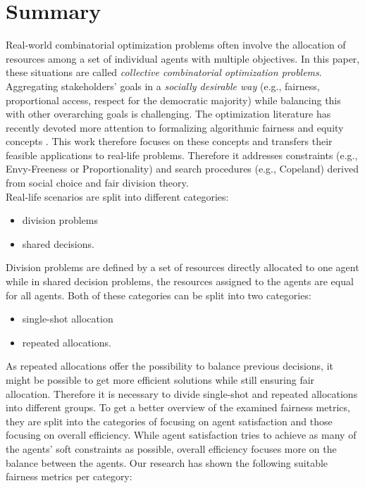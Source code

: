 \documentclass[german, a4paper, 11pt, oneside]{scrbook}
\begin{document}
\chapter{Summary}
Real-world combinatorial optimization problems often involve the allocation of resources among a set of individual agents with multiple objectives.
In this paper, these situations are called \emph{collective combinatorial optimization problems}. 
Aggregating stakeholders' goals in a \emph{socially desirable way} (e.g., fairness, proportional access, respect for the democratic majority) while balancing this with other overarching goals is challenging. The optimization literature has recently devoted more attention to formalizing algorithmic fairness and equity concepts \cite{XinyingChen.2023}. This work therefore focuses on these concepts and transfers their feasible applications to real-life problems. Therefore it addresses constraints (e.g., Envy-Freeness or Proportionality) and search procedures (e.g., Copeland) derived from social choice and fair division theory. \\Real-life scenarios are split into different categories: 
 \begin{itemize}
\item division problems 
\item shared decisions. 
\end{itemize}
Division problems are defined by a set of resources directly allocated to one agent while in shared decision problems, the resources assigned to the agents are equal for all agents. Both of these categories can be split into two categories:
\begin{itemize}
\item single-shot allocation
\item repeated allocations.
\end{itemize} 
As repeated allocations offer the possibility to balance previous decisions, it might be possible to get more efficient solutions while still ensuring fair allocation. Therefore it is necessary to divide single-shot and repeated allocations into different groups. To get a better overview of the examined fairness metrics, they are split into the categories of focusing on agent satisfaction and those focusing on overall efficiency. While agent satisfaction tries to achieve as many of the agents' soft constraints as possible, overall efficiency focuses more on the balance between the agents.
Our research has shown the following suitable fairness metrics per category:
\\\\
\end{document}
